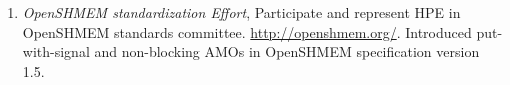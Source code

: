 \begin{enumerate}
\setcounter{enumi}{0}
\item \textit{OpenSHMEM standardization Effort}, Participate and represent HPE
in OpenSHMEM standards committee. \url{http://openshmem.org/}. Introduced
put-with-signal and non-blocking AMOs in OpenSHMEM specification version 1.5.
\end{enumerate}
